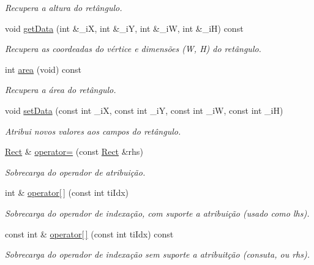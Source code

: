 \begin{DoxyCompactItemize}
\begin{DoxyCompactList}\small\item\em Recupera a altura do ret\^{a}ngulo. \end{DoxyCompactList}\item 
void \hyperlink{classMyRectangle_1_1Rect_a6712fd56b5a4e82b8afb2792b3f6e81e}{get\+Data} (int \&\+\_\+iX, int \&\+\_\+iY, int \&\+\_\+iW, int \&\+\_\+iH) const 
\begin{DoxyCompactList}\small\item\em Recupera as coordeadas do v\'{e}rtice e dimens\~{o}es (W, H) do ret\^{a}ngulo. \end{DoxyCompactList}\item 
int \hyperlink{classMyRectangle_1_1Rect_a1487a3c8eff2cdcf06fb2912d3ba3c42}{area} (void) const 
\begin{DoxyCompactList}\small\item\em Recupera a \'{a}rea do ret\^{a}ngulo. \end{DoxyCompactList}\item 
void \hyperlink{classMyRectangle_1_1Rect_a14f9747508910ceb840af754c6d7d84c}{set\+Data} (const int \+\_\+iX, const int \+\_\+iY, const int \+\_\+iW, const int \+\_\+iH)
\begin{DoxyCompactList}\small\item\em Atribui novos valores aos campos do ret\^{a}ngulo. \end{DoxyCompactList}\item 
\hyperlink{classMyRectangle_1_1Rect}{Rect} \& \hyperlink{classMyRectangle_1_1Rect_aabdb7cc60d4fe8d8984dd299cd27d2a5}{operator=} (const \hyperlink{classMyRectangle_1_1Rect}{Rect} \&rhs)
\begin{DoxyCompactList}\small\item\em Sobrecarga do operador de atribui\c{c}\~{a}o. \end{DoxyCompactList}\item 
int \& \hyperlink{classMyRectangle_1_1Rect_ab3cf22290cfe7815a335176124b30f5f}{operator\mbox{[}$\,$\mbox{]}} (const int ti\+Idx)
\begin{DoxyCompactList}\small\item\em Sobrecarga do operador de indexa\c{c}\~{a}o, com suporte a atribui\c{c}\~{a}o (usado como lhs). \end{DoxyCompactList}\item 
const int \& \hyperlink{classMyRectangle_1_1Rect_a3530bda1bee8366295b6c85229ec0bd4}{operator\mbox{[}$\,$\mbox{]}} (const int ti\+Idx) const 
\begin{DoxyCompactList}\small\item\em Sobrecarga do operador de indexa\c{c}\~{a}o sem suporte a atribuit\c{c}\~{a}o (consuta, ou rhs). \end{DoxyCompactList}\end{DoxyCompactItemize}
